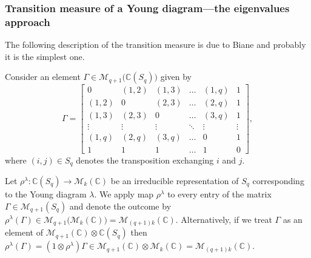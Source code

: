 \documentclass[12pt,dvips]{amsart}
\numberwithin{equation}{section} \numberwithin{figure}{section}
\theoremstyle{plain}
\theoremstyle{definition}
\theoremstyle{remark}
\newcommand{\C}{{\mathbb{C}}}
\newcommand{\M}{{\mathcal{M}}}
\newcommand{\Sn}[1]{{{S}}_{#1}}
\begin{document}
\subsubsection{Transition measure of a Young diagram---the
eigenvalues approach} 
\label{subsec:biane} The following description of the transition
measure is due to Biane \cite{Biane1998} and probably it is the
simplest one.

Consider an element $\Gamma\in \M_{q+1}\big( \C(\Sn{q}) \big)$ given
by
\begin{equation} \label{eq:macierzjucysia}
\Gamma=\left[
\begin{matrix}   0 & (1,2) & (1,3) & \dots & (1,q) & 1 \\
 (1,2) & 0 & (2,3) & \dots  & (2,q) & 1 \\
(1,3) & (2,3) & 0  & \dots  & (3,q) & 1 \\
 \vdots & \vdots & \vdots & \ddots  & \vdots & \vdots \\
 (1,q) & (2,q) & (3,q) & \dots  & 0 & 1 \\
 1 & 1 & 1 & \dots & 1 & 0
 \end{matrix} \right],
 \end{equation}
where $(i,j)\in\Sn{q}$ denotes the transposition exchanging $i$ and
$j$.

Let $\rho^{\lambda}:\C(\Sn{q})\rightarrow \M_k(\C)$ be an
irreducible representation of $\Sn{q}$ corresponding to the Young
diagram $\lambda$. We apply map $\rho^{\lambda}$ to every entry of
the matrix $\Gamma\in \M_{q+1}(\Sn{q})$ and denote the outcome by
$\rho^{\lambda}(\Gamma)\in \M_{q+1}\big( \M_{k}(\C) \big)= \M_{(q+1)
k} (\C)$. Alternatively, if we treat $\Gamma$ as an element of
$\M_{q+1}(\C) \otimes \C(\Sn{q})$ then $\rho^{\lambda}(\Gamma)= (1
\otimes \rho^{\lambda}) \Gamma\in \M_{q+1}(\C) \otimes
\M_k(\C)=\M_{(q+1)k}(\C)$.
\end{document}
